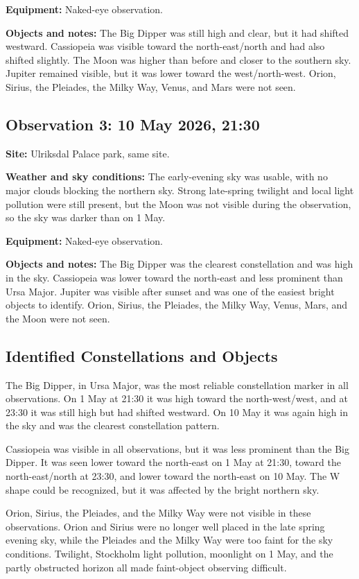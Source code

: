 \documentclass[a4paper,11pt]{article}
\begin{document}
\textbf{Equipment:} Naked-eye observation.

\textbf{Objects and notes:} The Big Dipper was still high and clear, but it had shifted westward. Cassiopeia was visible toward the north-east/north and had also shifted slightly. The Moon was higher than before and closer to the southern sky. Jupiter remained visible, but it was lower toward the west/north-west. Orion, Sirius, the Pleiades, the Milky Way, Venus, and Mars were not seen.

\subsection*{Observation 3: 10 May 2026, 21:30}
\textbf{Site:} Ulriksdal Palace park, same site.

\textbf{Weather and sky conditions:} The early-evening sky was usable, with no major clouds blocking the northern sky. Strong late-spring twilight and local light pollution were still present, but the Moon was not visible during the observation, so the sky was darker than on 1 May.

\textbf{Equipment:} Naked-eye observation.

\textbf{Objects and notes:} The Big Dipper was the clearest constellation and was high in the sky. Cassiopeia was lower toward the north-east and less prominent than Ursa Major. Jupiter was visible after sunset and was one of the easiest bright objects to identify. Orion, Sirius, the Pleiades, the Milky Way, Venus, Mars, and the Moon were not seen.

\subsection{Identified Constellations and Objects}
The Big Dipper, in Ursa Major, was the most reliable constellation marker in all observations. On 1 May at 21:30 it was high toward the north-west/west, and at 23:30 it was still high but had shifted westward. On 10 May it was again high in the sky and was the clearest constellation pattern.

Cassiopeia was visible in all observations, but it was less prominent than the Big Dipper. It was seen lower toward the north-east on 1 May at 21:30, toward the north-east/north at 23:30, and lower toward the north-east on 10 May. The W shape could be recognized, but it was affected by the bright northern sky.

Orion, Sirius, the Pleiades, and the Milky Way were not visible in these observations. Orion and Sirius were no longer well placed in the late spring evening sky, while the Pleiades and the Milky Way were too faint for the sky conditions. Twilight, Stockholm light pollution, moonlight on 1 May, and the partly obstructed horizon all made faint-object observing difficult.
\end{document}
